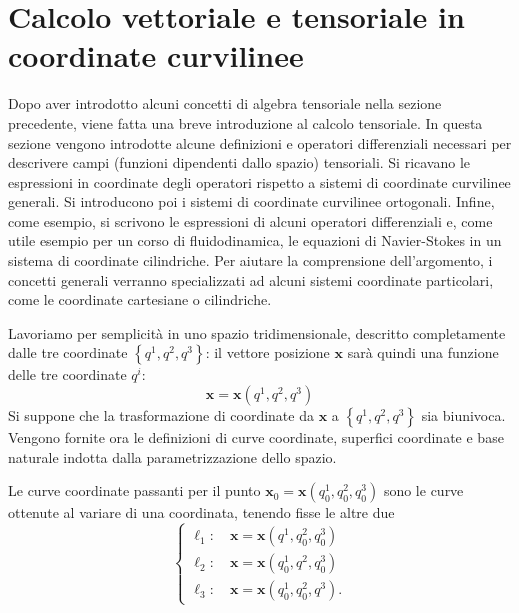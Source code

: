\section{Calcolo vettoriale e tensoriale in coordinate curvilinee}

Dopo aver introdotto alcuni concetti di algebra tensoriale nella sezione precedente, viene fatta una breve introduzione al calcolo tensoriale. In questa sezione vengono introdotte alcune definizioni e operatori differenziali necessari per descrivere campi (funzioni dipendenti dallo spazio) tensoriali. Si ricavano le espressioni in coordinate degli operatori rispetto a sistemi di coordinate curvilinee generali. Si introducono poi i sistemi di coordinate curvilinee ortogonali. Infine, come esempio, si scrivono le espressioni di alcuni operatori differenziali e, come utile esempio per un corso di fluidodinamica, le equazioni di Navier-Stokes in un sistema di coordinate cilindriche.
Per aiutare la comprensione dell'argomento, i concetti generali verranno specializzati ad alcuni sistemi coordinate particolari, come le coordinate cartesiane o cilindriche.

Lavoriamo per semplicità in uno spazio tridimensionale, descritto completamente
 dalle tre coordinate $\left\{q^1, q^2, q^3\right\}$: il vettore posizione $\bm{x}$ sarà quindi una funzione
 delle tre coordinate $q^i$:
 \begin{equation}
  \bm{x} = \bm{x}(q^1, q^2, q^3)
 \end{equation}
 Si suppone che la trasformazione di coordinate da $\bm{x}$ a $\left\{q^1, q^2, q^3\right\}$ sia biunivoca. Vengono fornite ora le definizioni di curve coordinate, superfici coordinate e base naturale indotta dalla parametrizzazione dello spazio.

\begin{definition}
 Le curve coordinate passanti per il punto $\bm{x}_0=\bm{x}(q_0^1, q_0^2, q_0^3)$ sono le curve ottenute al variare di una coordinata, tenendo fisse le altre due
 \begin{equation}
 \begin{cases}
  \ell_1 : \quad \bm{x} = \bm{x}(q^1, q_0^2, q_0^3) \\
  \ell_2 : \quad \bm{x} = \bm{x}(q_0^1, q^2, q_0^3) \\
  \ell_3 : \quad \bm{x} = \bm{x}(q_0^1, q_0^2, q^3) .
 \end{cases}
 \end{equation}
\end{definition}
 
